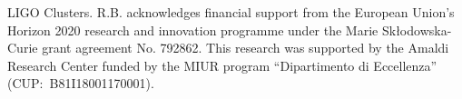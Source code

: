 LIGO Clusters. 
R.B. acknowledges financial support from the European Union's Horizon 2020 research and innovation programme under the Marie Sk\l odowska-Curie grant agreement No. 792862. This research was supported by the Amaldi Research Center funded by the MIUR program ``Dipartimento di Eccellenza'' (CUP:~B81I18001170001).
